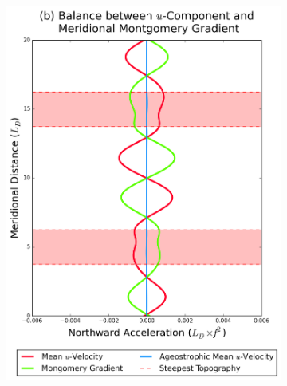 \documentclass[12pt,a4paper]{report}
\begin{document}
\begin{figure}
\begin{subfigure}{0.46\linewidth}
 		\includegraphics[width=\linewidth ]{vgeo_2}
 		\label{fig:vgeolayer2}
 	\end{subfigure}
 	\begin{subfigure}{0.46\linewidth}
 		\centering

\end{subfigure}
\end{figure}
\end{document}
